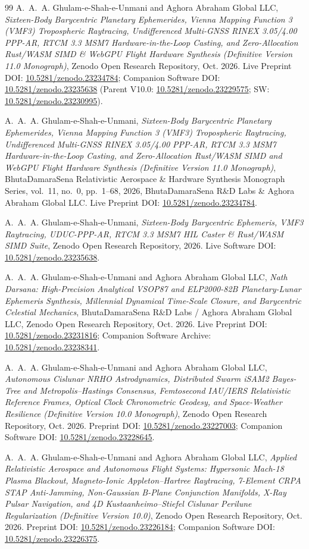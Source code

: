 \documentclass[11pt,a4paper,reqno]{article}
\def\texttt#1{#1}%
\newcommand{\zenodo}[1]{\href{https://doi.org/10.5281/zenodo.#1}{\texttt{10.5281/\allowbreak zenodo.#1}}}
\theoremstyle{plain}
\theoremstyle{definition}
\theoremstyle{remark}
\numberwithin{equation}{section}
\begin{document}
\begin{thebibliography}{99}
A.~A.~A. Ghulam-e-Shah-e-Unmani and {Aghora Abraham Global LLC},
\emph{Sixteen-Body Barycentric Planetary Ephemerides, Vienna Mapping Function 3 (VMF3) Tropospheric Raytracing, Undifferenced Multi-GNSS RINEX 3.05/4.00 PPP-AR, RTCM 3.3 MSM7 Hardware-in-the-Loop Casting, and Zero-Allocation Rust/WASM SIMD \& WebGPU Flight Hardware Synthesis (Definitive Version 11.0 Monograph)},
Zenodo Open Research Repository, Oct. 2026.
Live Preprint DOI: \zenodo{23234784}; Companion Software DOI: \zenodo{23235638} (Parent V10.0: \zenodo{23229575}; SW: \zenodo{23230995}).

A.~A.~A. Ghulam-e-Shah-e-Unmani,
\emph{Sixteen-Body Barycentric Planetary Ephemerides, Vienna Mapping Function 3 (VMF3) Tropospheric Raytracing, Undifferenced Multi-GNSS RINEX 3.05/4.00 PPP-AR, RTCM 3.3 MSM7 Hardware-in-the-Loop Casting, and Zero-Allocation Rust/WASM SIMD and WebGPU Flight Hardware Synthesis (Definitive Version 11.0 Monograph)},
BhutaDamaraSena Relativistic Aerospace \& Hardware Synthesis Monograph Series, vol.~11, no.~0, pp.~1--68, 2026, BhutaDamaraSena R\&D Labs \& Aghora Abraham Global LLC.
Live Preprint DOI: \zenodo{23234784}.

A.~A.~A. Ghulam-e-Shah-e-Unmani,
\emph{Sixteen-Body Barycentric Ephemeris, VMF3 Raytracing, UDUC-PPP-AR, RTCM 3.3 MSM7 HIL Caster \& Rust/WASM SIMD Suite},
Zenodo Open Research Repository, 2026.
Live Software DOI: \zenodo{23235638}.

A.~A.~A. Ghulam-e-Shah-e-Unmani and {Aghora Abraham Global LLC},
\emph{Nath Darsana: High-Precision Analytical VSOP87 and ELP2000-82B Planetary-Lunar Ephemeris Synthesis, Millennial Dynamical Time-Scale Closure, and Barycentric Celestial Mechanics},
BhutaDamaraSena R\&D Labs / Aghora Abraham Global LLC, Zenodo Open Research Repository, Oct. 2026.
Live Preprint DOI: \zenodo{23231816}; Companion Software Archive: \zenodo{23238341}.

A.~A.~A. Ghulam-e-Shah-e-Unmani and {Aghora Abraham Global LLC},
\emph{Autonomous Cislunar NRHO Astrodynamics, Distributed Swarm iSAM2 Bayes-Tree and Metropolis--Hastings Consensus, Femtosecond IAU/IERS Relativistic Reference Frames, Optical Clock Chronometric Geodesy, and Space-Weather Resilience (Definitive Version 10.0 Monograph)},
Zenodo Open Research Repository, Oct. 2026.
Preprint DOI: \zenodo{23227003}; Companion Software DOI: \zenodo{23228645}.

A.~A.~A. Ghulam-e-Shah-e-Unmani and {Aghora Abraham Global LLC},
\emph{Applied Relativistic Aerospace and Autonomous Flight Systems: Hypersonic Mach-18 Plasma Blackout, Magneto-Ionic Appleton--Hartree Raytracing, 7-Element CRPA STAP Anti-Jamming, Non-Gaussian B-Plane Conjunction Manifolds, X-Ray Pulsar Navigation, and 4D Kustaanheimo--Stiefel Cislunar Perilune Regularization (Definitive Version 10.0)},
Zenodo Open Research Repository, Oct. 2026.
Preprint DOI: \zenodo{23226184}; Companion Software DOI: \zenodo{23226375}.


\end{thebibliography}
\end{document}
